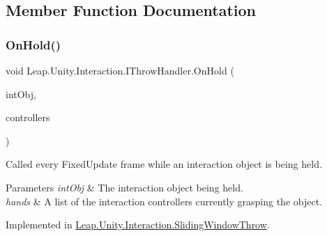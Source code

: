 \subsection{Member Function Documentation}
\mbox{\label{interface_leap_1_1_unity_1_1_interaction_1_1_i_throw_handler_a416c8f5dc270ba95034487124b502079}} 
\subsubsection{\texorpdfstring{OnHold()}{OnHold()}}
{\footnotesize\ttfamily void Leap.\+Unity.\+Interaction.\+I\+Throw\+Handler.\+On\+Hold (\begin{DoxyParamCaption}\item[{\mbox{\hyperlink{class_leap_1_1_unity_1_1_interaction_1_1_interaction_behaviour}{Interaction\+Behaviour}}}]{int\+Obj,  }\item[{\mbox{\hyperlink{struct_leap_1_1_unity_1_1_readonly_list}{Readonly\+List}}$<$ \mbox{\hyperlink{class_leap_1_1_unity_1_1_interaction_1_1_interaction_controller}{Interaction\+Controller}} $>$}]{controllers }\end{DoxyParamCaption})}



Called every Fixed\+Update frame while an interaction object is being held. 


\begin{DoxyParams}{Parameters}
{\em int\+Obj} & The interaction object being held.\\
\hline
{\em hands} & A list of the interaction controllers currently grasping the object.\\
\hline
\end{DoxyParams}


Implemented in \mbox{\hyperlink{class_leap_1_1_unity_1_1_interaction_1_1_sliding_window_throw_ae0b88c5531628875477b51d107ba1c11}{Leap.\+Unity.\+Interaction.\+Sliding\+Window\+Throw}}.

\mbox{\label{interface_leap_1_1_unity_1_1_interaction_1_1_i_throw_handler_a29ebb0b201a7ae85dc484d91a716ecb6}} 
